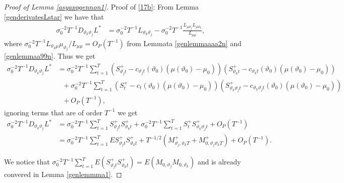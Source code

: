 {{\begin{proof}[Proof of Lemma \ref{asyappgennon1}]
Proof of \eqref{17b}: From Lemma \ref{genderivatesLstar} we have that 
\begin{align*}
   \sigma_0^{-2} T^{-1} D_{\vartheta_k \vartheta_j } L^* &= \sigma_0^{-2} T^{-1} L_{\vartheta_k  \vartheta_j} -  \sigma_0^{-2} T^{-1} \frac{L_{\mu \vartheta_j} L_{\mu \vartheta_k}}{L_{\mu \mu} },
\end{align*}
where  $\sigma_0^{-2} T^{-1} L_{\vartheta_k \mu}\mu_{\vartheta_j}/L_{\mu \mu} = O_P(T^{-1})$ from Lemmata \ref{genlemmaaaa2n} and \ref{genlemmaa99n}. Thus we get 
\begin{align*}
     \sigma_0^{-2} T^{-1} D_{\vartheta_k \vartheta_j } L^* &=  \sigma_0^{-2} T^{-1} \sum_{t = 1}^T \left( S_{\vartheta_j t}^+ -  c_{\vartheta_j t}(\vartheta_0)\left(\mu(\vartheta_0)-\mu_0\right)\right) \left( S_{\vartheta_k t}^+ -  c_{\vartheta_k t}(\vartheta_0)\left(\mu(\vartheta_0)-\mu_0\right)\right) \\
    &\ \ \ +  \sigma_0^{-2} T^{-1}  \sum_{t = 1}^T  \left(S_{t}^+ - c_{t}(\vartheta_0)\left(\mu(\vartheta_0)-\mu_0\right)\right) \left( S_{ \vartheta_k  \vartheta_j t}^+ -  c_{\vartheta_k  \vartheta_j t}(\vartheta_0)\left(\mu(\vartheta_0)-\mu_0\right)\right) \\
    &\ \ \ +  O_P(T^{-1} ), 
\end{align*}
ignoring terms that are of order $T^{-1}$ we get
\begin{align*}
 \sigma_0^{-2} T^{-1} D_{\vartheta_k \vartheta_j } L^* &= \sigma_0^{-2} T^{-1} \sum_{t = 1}^T S_{\vartheta_j t}^+ S_{\vartheta_k t}^+ + \sigma_0^{-2} T^{-1} \sum_{t = 1}^T S_{t}^+ S_{ \vartheta_k  \vartheta_j t}^+ +   O_P(T^{-1}) \\
 &= \sigma_0^{-2} T^{-1} \sum_{t = 1}^T E S_{\vartheta_j t}^+ S_{\vartheta_k t}^+ + T^{-1/2} \left( M^+_{\vartheta_j,\vartheta_k T} + M^+_{0,\vartheta_j \vartheta_k T}\right) +  O_P(T^{-1} ).
\end{align*}

We notice that $\sigma_0^{-2} T^{-1} \sum_{t = 1}^T E  \left( S_{\vartheta_j t}^+ S_{\vartheta_k t}^+ \right)  = E \left( M_{0,\vartheta_j} M_{0,\vartheta_k} \right)$ and is already convered in Lemma \ref{genlemmma1}.


\end{proof}}}
